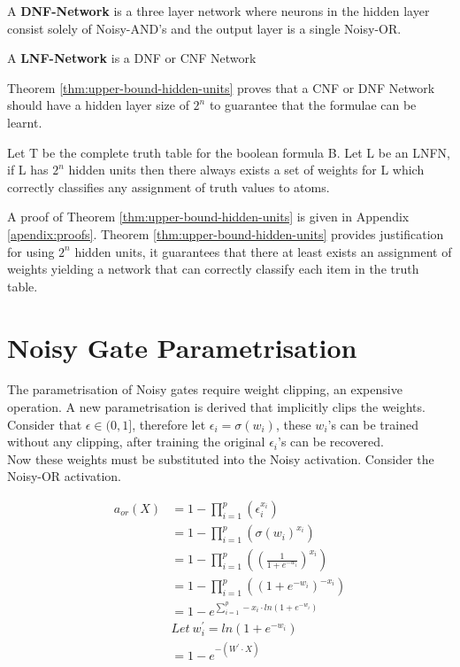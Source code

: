 \theoremstyle{definition}
\begin{definition} \label{def:dnf-network}
A \textbf{DNF-Network} is a three layer network where neurons in the hidden layer consist solely of Noisy-AND's and the output layer is a single Noisy-OR. 
\end{definition}

\theoremstyle{definition}
\begin{definition} \label{def:lnfn}
A \textbf{LNF-Network} is a DNF or CNF Network
\end{definition}

Theorem \ref{thm:upper-bound-hidden-units} proves that a CNF or DNF Network should have a hidden layer size of $2^n$ to guarantee that the formulae can be learnt.

\begin{theorem}
Let T be the complete truth table for the boolean formula B. Let L be an LNFN, if L has $2^n$ hidden units then there always exists a set of weights for L which correctly classifies any assignment of truth values to atoms.
\label{thm:upper-bound-hidden-units}
\end{theorem}

A proof of Theorem \ref{thm:upper-bound-hidden-units} is given in Appendix \ref{apendix:proofs}. Theorem \ref{thm:upper-bound-hidden-units} provides justification for using $2^n$ hidden units, it guarantees that there at least exists an assignment of weights yielding a network that can correctly classify each item in the truth table.

\section{Noisy Gate Parametrisation} \label{sec:real-noisy-parametrisation}
The parametrisation of Noisy gates require weight clipping, an expensive operation. A new parametrisation is derived that implicitly clips the weights. Consider that $\epsilon \in (0, 1]$, therefore let $\epsilon_i = \sigma(w_i)$, these $w_i$'s can be trained without any clipping, after training the original $\epsilon_i$'s can be recovered.\\

Now these weights must be substituted into the Noisy activation. Consider the Noisy-OR activation.

\begin{align*}
a_{or}(X) &= 1 - \prod^p_{i=1}(\epsilon_i^{x_i})\\
&= 1 - \prod^p_{i=1}(\sigma(w_i)^{x_i})\\
&= 1 - \prod^p_{i=1}((\frac{1}{1 + e^{-w_i}})^{x_i})\\
&= 1 - \prod^p_{i=1}((1 + e^{-w_i})^{-x_i})\\
&= 1 - e^{\sum^p_{i=1} -x_i \cdot ln(1 + e^{-w_i})} \\
&Let\ w_i^{'} = ln(1 + e^{-w_i})\\
&= 1 - e^{-(W^{'} \cdot X)}
\end{align*}

